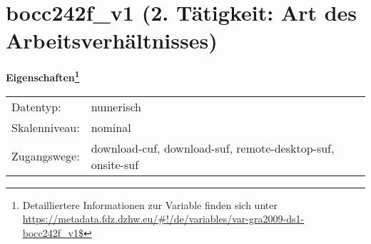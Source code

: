 
    \setcounter{footnote}{0}

    \vspace*{-1.8cm}
	\section{bocc242f\_v1 (2. Tätigkeit: Art des Arbeitsverhältnisses)}
	\label{section:bocc242f_v1}



    \vspace*{0.5cm}
    \noindent\textbf{Eigenschaften\footnote{Detailliertere Informationen zur Variable finden sich unter
		\url{https://metadata.fdz.dzhw.eu/\#!/de/variables/var-gra2009-ds1-bocc242f_v1$}}}\\
	\begin{tabularx}{\hsize}{@{}lX}
	Datentyp: & numerisch \\
	Skalenniveau: & nominal \\
	Zugangswege: &
	  download-cuf, 
	  download-suf, 
	  remote-desktop-suf, 
	  onsite-suf
 \\
    \end{tabularx}



